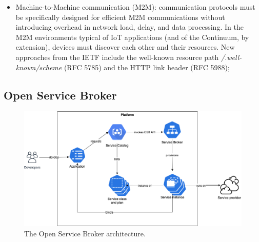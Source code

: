 \begin{itemize}
    \item Machine-to-Machine communication (M2M): communication protocols must be specifically designed for efficient M2M communications without introducing overhead in network load, delay, and data processing. In the M2M environments typical of IoT applications (and of the Continuum, by extension), devices must discover each other and their resources. New approaches from the IETF include the well-known resource path \emph{/.well-known/scheme} (RFC 5785) and the HTTP link header (RFC 5988);
\end{itemize}


\subsection{Open Service Broker}
\label{sec:osb}

\begin{figure}[ht]
\centering
\includegraphics[width=\columnwidth]{figures/osb}
\caption{The Open Service Broker architecture.} \label{fig:osb}
\end{figure}

